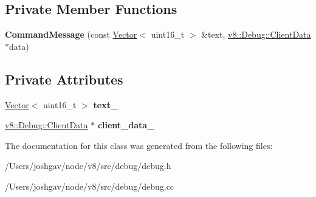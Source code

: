 \subsection*{Private Member Functions}
\begin{DoxyCompactItemize}
\item 
{\bfseries Command\+Message} (const \hyperlink{classv8_1_1internal_1_1_vector}{Vector}$<$ uint16\+\_\+t $>$ \&text, \hyperlink{classv8_1_1_debug_1_1_client_data}{v8\+::\+Debug\+::\+Client\+Data} $\ast$data)\hypertarget{classv8_1_1internal_1_1_command_message_a0ddfe8665f394b04f80a83c3a7f29618}{}\label{classv8_1_1internal_1_1_command_message_a0ddfe8665f394b04f80a83c3a7f29618}

\end{DoxyCompactItemize}
\subsection*{Private Attributes}
\begin{DoxyCompactItemize}
\item 
\hyperlink{classv8_1_1internal_1_1_vector}{Vector}$<$ uint16\+\_\+t $>$ {\bfseries text\+\_\+}\hypertarget{classv8_1_1internal_1_1_command_message_a725db5ea298ae777423d05d642bc73c7}{}\label{classv8_1_1internal_1_1_command_message_a725db5ea298ae777423d05d642bc73c7}

\item 
\hyperlink{classv8_1_1_debug_1_1_client_data}{v8\+::\+Debug\+::\+Client\+Data} $\ast$ {\bfseries client\+\_\+data\+\_\+}\hypertarget{classv8_1_1internal_1_1_command_message_a7be32cf5be1f05c224ea0bcb768a4a7f}{}\label{classv8_1_1internal_1_1_command_message_a7be32cf5be1f05c224ea0bcb768a4a7f}

\end{DoxyCompactItemize}


The documentation for this class was generated from the following files\+:\begin{DoxyCompactItemize}
\item 
/\+Users/joshgav/node/v8/src/debug/debug.\+h\item 
/\+Users/joshgav/node/v8/src/debug/debug.\+cc\end{DoxyCompactItemize}
